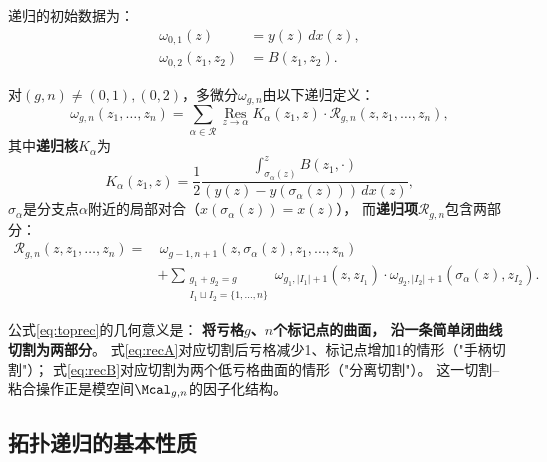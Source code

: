 \begin{definition}[初始数据]\label{def:initial}
递归的初始数据为：
\begin{align}
\omega_{0,1}(z) &= y(z) \, dx(z), \label{eq:omega01} \\
\omega_{0,2}(z_1, z_2) &= B(z_1, z_2). \label{eq:omega02}
\end{align}
\end{definition}

\begin{definition}[核心递归公式]\label{def:toprec}
对$(g, n) \neq (0, 1), (0, 2)$，多微分$\omega_{g,n}$由以下递归定义：
\begin{equation}\label{eq:toprec}
\omega_{g,n}(z_1, \ldots, z_n)
= \sum_{\alpha \in \mathcal{R}} \operatorname*{Res}_{z \to \alpha}
K_\alpha(z_1, z) \cdot \mathcal{R}_{g,n}(z, z_1, \ldots, z_n),
\end{equation}
其中\textbf{递归核}$K_\alpha$为
\begin{equation}\label{eq:kernel}
K_\alpha(z_1, z) = \frac{1}{2} \frac{\int_{\sigma_\alpha(z)}^z B(z_1, \cdot)}
{(y(z) - y(\sigma_\alpha(z))) \, dx(z)},
\end{equation}
$\sigma_\alpha$是分支点$\alpha$附近的局部对合（$x(\sigma_\alpha(z)) = x(z)$），
而\textbf{递归项}$\mathcal{R}_{g,n}$包含两部分：
\begin{align}
\mathcal{R}_{g,n}(z, z_1, \ldots, z_n)
= &\, \omega_{g-1, n+1}(z, \sigma_\alpha(z), z_1, \ldots, z_n) \label{eq:recA} \\
&+ \sum_{\substack{g_1+g_2=g \\ I_1 \sqcup I_2 = \{1,\ldots,n\}}}
\omega_{g_1, |I_1|+1}(z, z_{I_1}) \cdot \omega_{g_2, |I_2|+1}(\sigma_\alpha(z), z_{I_2}). \label{eq:recB}
\end{align}
\end{definition}

\begin{remark}[递归的几何意义]\label{rmk:recgeom}
公式\eqref{eq:toprec}的几何意义是：
\textbf{将亏格$g$、$n$个标记点的曲面，
沿一条简单闭曲线切割为两部分}。
式\eqref{eq:recA}对应切割后亏格减少1、标记点增加1的情形（"手柄切割"）；
式\eqref{eq:recB}对应切割为两个低亏格曲面的情形（"分离切割"）。
这一切割--粘合操作正是模空间$\Mcal_{g,n}$的因子化结构。
\end{remark}

\subsection{拓扑递归的基本性质}

